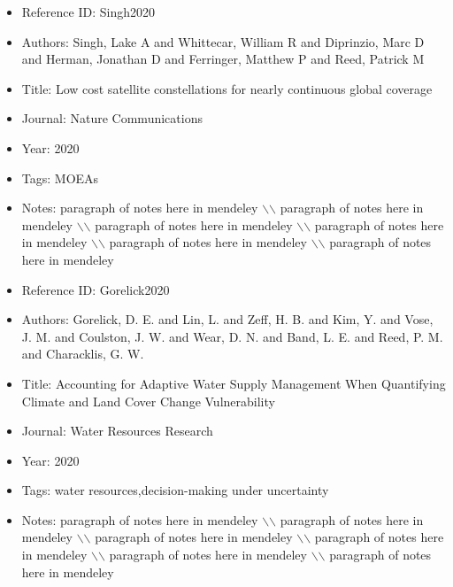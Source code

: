 \documentclass[11pt]{article}
\begin{document}
\noindent\citep{Singh2020} 
\begin{itemize} 
\item{Reference ID:  Singh2020} 

\item{Authors:  Singh, Lake A and Whittecar, William R and Diprinzio, Marc D and Herman, Jonathan D and Ferringer, Matthew P and Reed, Patrick M} 

\item{Title:  Low cost satellite constellations for nearly continuous global coverage} 

\item{Journal:  Nature Communications} 

\item{Year:  2020} 

\item{Tags:  MOEAs} 

\item{Notes:  paragraph of notes here in mendeley $\backslash$$\backslash$ paragraph of notes here in mendeley $\backslash$$\backslash$ paragraph of notes here in mendeley $\backslash$$\backslash$ paragraph of notes here in mendeley $\backslash$$\backslash$ paragraph of notes here in mendeley $\backslash$$\backslash$ paragraph of notes here in mendeley} 

\end{itemize}\medskip



\noindent\citep{Gorelick2020} 
\begin{itemize} 
\item{Reference ID:  Gorelick2020} 

\item{Authors:  Gorelick, D. E. and Lin, L. and Zeff, H. B. and Kim, Y. and Vose, J. M. and Coulston, J. W. and Wear, D. N. and Band, L. E. and Reed, P. M. and Characklis, G. W.} 

\item{Title:  Accounting for Adaptive Water Supply Management When Quantifying Climate and Land Cover Change Vulnerability} 

\item{Journal:  Water Resources Research} 

\item{Year:  2020} 

\item{Tags:  water resources,decision-making under uncertainty} 

\item{Notes:  paragraph of notes here in mendeley $\backslash$$\backslash$ paragraph of notes here in mendeley $\backslash$$\backslash$ paragraph of notes here in mendeley $\backslash$$\backslash$ paragraph of notes here in mendeley $\backslash$$\backslash$ paragraph of notes here in mendeley $\backslash$$\backslash$ paragraph of notes here in mendeley} 

\end{itemize}\medskip
\end{document}
